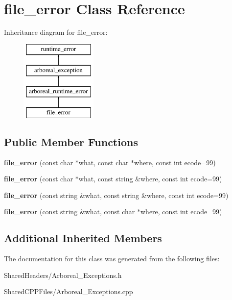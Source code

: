\hypertarget{classfile__error}{}\section{file\+\_\+error Class Reference}
\label{classfile__error}
Inheritance diagram for file\+\_\+error\+:\begin{figure}[H]
\begin{center}
\leavevmode
\includegraphics[height=4.000000cm]{classfile__error}
\end{center}
\end{figure}
\subsection*{Public Member Functions}
\begin{DoxyCompactItemize}
\item 
\mbox{\label{classfile__error_a10da41c5d15b25fdafa97ae79523e242}} 
{\bfseries file\+\_\+error} (const char $\ast$what, const char $\ast$where, const int ecode=99)
\item 
\mbox{\label{classfile__error_ae70ca16a0a8eee95a88a64128b7fcbad}} 
{\bfseries file\+\_\+error} (const char $\ast$what, const string \&where, const int ecode=99)
\item 
\mbox{\label{classfile__error_a9b1c03f989df972ca3201f984ddece6d}} 
{\bfseries file\+\_\+error} (const string \&what, const string \&where, const int ecode=99)
\item 
\mbox{\label{classfile__error_a2698ca75c20dd3ffc5adb8d470fff246}} 
{\bfseries file\+\_\+error} (const string \&what, const char $\ast$where, const int ecode=99)
\end{DoxyCompactItemize}
\subsection*{Additional Inherited Members}


The documentation for this class was generated from the following files\+:\begin{DoxyCompactItemize}
\item 
Shared\+Headers/Arboreal\+\_\+\+Exceptions.\+h\item 
Shared\+C\+P\+P\+Files/Arboreal\+\_\+\+Exceptions.\+cpp\end{DoxyCompactItemize}

